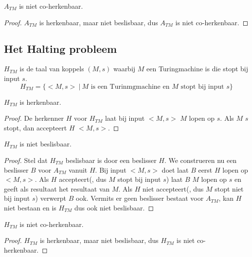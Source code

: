 \documentclass[main.tex]{subfiles}
\begin{document}
\begin{gev}
  \label{gev:a-tm-niet-coherk}
  $A_{TM}$ is niet co-herkenbaar.
  \begin{proof}
    $A_{TM}$ is herkenbaar, maar niet beslisbaar, dus $A_{TM}$ is niet co-herkenbaar.
  \end{proof}
\end{gev}

\subsection{Het Halting probleem}
\label{sec:het-halting-probleem}

\begin{de}
  \label{de:h-tm}
  $H_{TM}$ is de taal van koppels $(M,s)$ waarbij $M$ een Turingmachine is die stopt bij input $s$.
  \[ H_{TM} = \{ <M,s> \ |\ M \text{ is een Turinmgmachine en } M \text{ stopt bij input } s \} \]
\end{de}

\begin{st}
  \label{st:h-tm-herk}
  $H_{TM}$ is herkenbaar.
  \begin{proof}
    De herkenner $H$ voor $H_{TM}$ laat bij input $<M,s>$ $M$ lopen op $s$.
    Als $M$ $s$ stopt, dan accepteert $H$ $<M,s>$.
  \end{proof}
\end{st}

\begin{st}
  \label{st:h-tm-niet-besl}
  $H_{TM}$ is niet beslisbaar.

  \begin{proof}
    Stel dat $H_{TM}$ beslisbaar is door een beslisser $H$.
    We construeren nu een beslisser $B$ voor $A_{TM}$ vanuit $H$.
    Bij input $<M,s>$ doet laat $B$ eerst $H$ lopen op $<M,s>$.
    Als $H$ accepteert(, dus $M$ stopt bij input $s$) laat $B$ $M$ lopen op $s$ en geeft als resultaat het resultaat van $M$.
    Als $H$ niet accepteert(, dus $M$ stopt niet bij input $s$) verwerpt $B$ ook.
    Vermits er geen beslisser bestaat voor $A_{TM}$, kan $H$ niet bestaan en is $H_{TM}$ dus ook niet beslisbaar.
  \end{proof}
\end{st}

\begin{gev}
  \label{gev:h-tm-niet-coherk}
  $H_{TM}$ is niet co-herkenbaar.
  \begin{proof}
    $H_{TM}$ is herkenbaar, maar niet beslisbaar, dus $H_{TM}$ is niet co-herkenbaar.
  \end{proof}
\end{gev}
\end{document}
